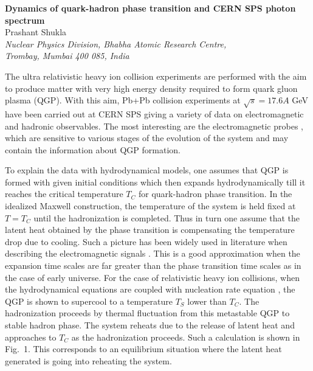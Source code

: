 \textwidth=14cm
\textheight=20cm
\pagestyle{empty}


\begin{center}
{\large \bf Dynamics of quark-hadron phase transition and 
  CERN SPS photon spectrum}\\
Prashant Shukla  \\
{\it Nuclear Physics Division, 
Bhabha Atomic Research Centre,\\
Trombay, Mumbai 400 085, India}\\
\end{center}

  The ultra relativistic heavy ion collision experiments are performed 
with the aim to produce matter with very high energy density required to 
form quark gluon plasma (QGP). With this aim, Pb+Pb collision experiments 
at $\sqrt s = 17.6A$ GeV have been carried out at CERN SPS giving a 
variety of data on electromagnetic and hadronic observables.
  The most interesting are the electromagnetic probes \cite{WA98}, 
which are sensitive to various stages of the evolution of the system and 
may contain the information about QGP formation. 

  To explain the data with hydrodynamical models, one assumes that QGP 
is formed with given initial conditions which then expands
hydrodynamically till it reaches the critical temperature $T_C$ for 
quark-hadron phase transition.
  In the idealized Maxwell construction, the temperature of the system 
is held fixed at $T=T_C$ until the hadronization is completed. 
Thus in turn one assume that the latent heat obtained by the phase 
transition is compensating the temperature drop due to cooling.
Such a picture has been widely used in literature when describing
the electromagnetic signals \cite{SRIVASTAVA}.
  This is a good approximation when the expansion time scales are far 
greater than the phase transition time scales as in the case of early 
universe. For the case of relativistic heavy ion collisions, when the
hydrodynamical equations are coupled with nucleation rate equation 
\cite{INHOMO}, the QGP is shown to supercool to a temperature 
$T_S$ lower than $T_C$. The hadronization proceeds by thermal fluctuation
from this metastable QGP to stable hadron phase. The system 
reheats due to the release of latent heat and approaches to $T_C$ as 
the hadronization proceeds. Such a calculation is shown in Fig.~1.
This corresponds to an equilibrium situation where the latent heat 
generated is going into reheating the system. 

